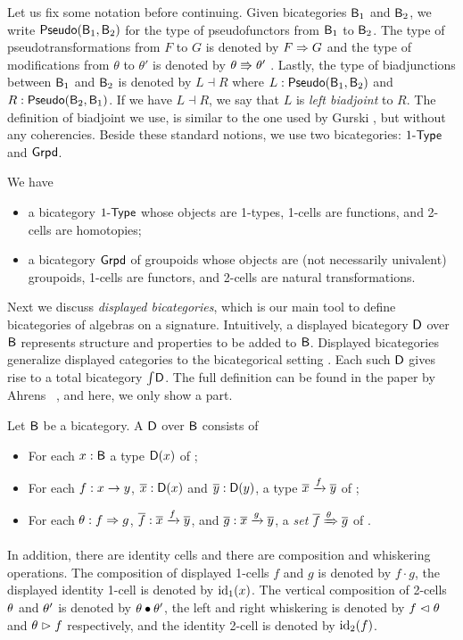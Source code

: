 Let us fix some notation before continuing.
Given bicategories $\mathsf{B}_1$ and $\mathsf{B}_2$, we write $\mathsf{Pseudo}(\mathsf{B}_1, \mathsf{B}_2)$ for the type of pseudofunctors from $\mathsf{B}_1$ to $\mathsf{B}_2$.
The type of pseudotransformations from $F$ to $G$ is denoted by $F \Rightarrow G$
and the type of modifications from $\theta$ to $\theta'$ is denoted by $\theta \Rrightarrow \theta'$ \cite{leinster:basic-bicats}.
Lastly, the type of biadjunctions between $\mathsf{B}_1$ and $\mathsf{B}_2$ is denoted by $L \dashv R$
where $L : \mathsf{Pseudo}(\mathsf{B}_1, \mathsf{B}_2)$ and $R : \mathsf{Pseudo}(\mathsf{B}_2, \mathsf{B}_1)$.
If we have $L \dashv R$, we say that $L$ is \emph{left biadjoint} to $R$.
The definition of biadjoint we use, is similar to the one used by Gurski \cite{gurski2012biequivalences},
but without any coherencies.
Beside these standard notions, we use two bicategories: $1\mbox{-}\mathsf{Type}$ and $\mathsf{Grpd}$.

\begin{example}
We have
\begin{itemize}
	\item a bicategory $1\mbox{-}\mathsf{Type}$ whose objects are 1-types, 1-cells are functions, and 2-cells are homotopies;
	\item a bicategory $\mathsf{Grpd}$ of groupoids
	whose objects are (not necessarily univalent) groupoids, 1-cells are functors, and 2-cells are natural transformations.
\end{itemize}
\end{example}

Next we discuss \emph{displayed bicategories}, which is our main tool to define bicategories of algebras on a signature.
Intuitively, a displayed bicategory $\mathsf{D}$ over $\mathsf{B}$ represents structure and properties to be added to $\mathsf{B}$.
Displayed bicategories generalize displayed categories to the bicategorical setting \cite{AhrensL19}.
Each such $\mathsf{D}$ gives rise to a total bicategory $\textstyle \int_{}{\mathsf{D}}$.
The full definition can be found in the paper by Ahrens \etal \ \cite{bicatjournal}, and here, we only show a part.

\begin{definition}
Let $\mathsf{B}$ be a bicategory.
A  $\mathsf{D}$ over $\mathsf{B}$ consists of
\begin{itemize}
	\item For each $x : \mathsf{B}$ a type ${\mathsf{D}}(x)$ of ;
	\item For each $f : x \rightarrow y$, $\overline{x} : {\mathsf{D}}(x)$ and $\overline{y} : {\mathsf{D}}(y)$,
	a type $\overline{x} \xrightarrow{f} \overline{y}$ of ;
	\item For each $\theta : f \Rightarrow g$, $\overline{f} : \overline{x} \xrightarrow{f} \overline{y}$, and $\overline{g} : \overline{x} \xrightarrow{g} \overline{y}$, a \emph{set} $\overline{f} \xRightarrow{\theta} \overline{g}$ of .
\end{itemize}
In addition, there are identity cells and there are composition and whiskering operations.
The composition of displayed 1-cells $f$ and $g$ is denoted by $f \cdot g$, the displayed identity 1-cell is denoted by $\operatorname{id}_1(x)$.
The vertical composition of 2-cells $\theta$ and $\theta'$ is denoted by $\theta \bullet \theta'$, the left and right whiskering is denoted by $f \vartriangleleft \theta$ and $\theta \vartriangleright f$ respectively,
and the identity 2-cell is denoted by $\operatorname{id}_2(f)$. 
\end{definition}


